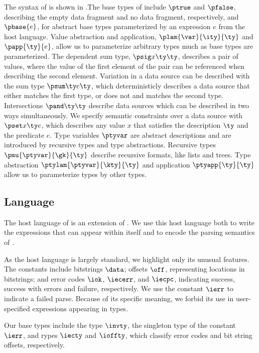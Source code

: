 The syntax of \ddc{} is shown in .The base
types of \ddc{} include $\ptrue$ and $\pfalse$, describing the empty
data fragment and no data fragment, respectively, and $\pbase{e}$, for
abstract base types parameterized by an expression $e$ from the host
language. Value abstraction and application, $\plam{\var}{\ity}{\ty}$
and $\papp{\ty}{e}$, allow us to parameterize arbitrary types much as
base types are parameterized. The dependent sum type, $\psig x \ty
\ty$, describes a pair of values, where the value of the first element
of the pair can be referenced when describing the second element.
Variation in a data source can be described with the sum type $\psum
\ty e \ty$, which deterministicly describes a data source that either
matches the first type, or does not and matches the second type.
Intersections $\pand \ty \ty$ describe data sources which can be
described in two ways simultaneously. We specify semantic constraints
over a data source with $\pset x \ty e$, which describes any value $x$
that satisfies the description $\ty$ and the predicate $e$. Type
variables $\ptyvar$ are abstract descriptions and are introduced by
recursive types and type abstractions. Recursive types
$\pmu{\ptyvar}{\gk}{\ty}$ describe recursive formats, like lists and
trees. Type abstraction $\ptylam{\ptyvar}{\kty}{\ty}$ and application
$\ptyapp{\ty}{\ty}$ allow us to parameterize types by other types.

\subsection{\Implang{} Language}
\label{sec:host-lang}

The host language of \ddc{} is an extension of \fomega.  We use this
host language both to write the expressions that can appear within
\ddc{} itself and to encode the parsing semantics of \ddc{}.

As the host language is largely standard, we highlight only its
unusual features. The constants include bitstrings $\data$; offsets
$\off$, representing locations in bitstrings; and error codes $\iok$,
$\iecerr$, and $\iecpc$, indicating success, success with errors and
failure, respectively. We use the constant $\ierr$ to indicate a
failed parse.  Because of its specific meaning, we forbid its use in
user-specified expressions appearing in \ddc{} types.

Our base types include the type $\invty$, the singleton type of the
constant $\ierr$, and rypes $\iecty$ and $\ioffty$, which classify
error codes and bit string offsets, respectively.

